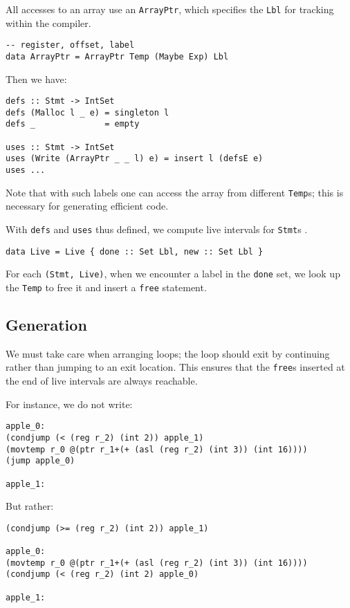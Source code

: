 \documentclass[acmsmall,screen,anonymous,nonacm]{acmart}
\begin{document}
All accesses to an array use an {\tt ArrayPtr}, which specifies the {\tt Lbl} for tracking within the compiler.

\begin{verbatim}
-- register, offset, label
data ArrayPtr = ArrayPtr Temp (Maybe Exp) Lbl
\end{verbatim}

Then we have:

\begin{verbatim}
defs :: Stmt -> IntSet
defs (Malloc l _ e) = singleton l
defs _              = empty

uses :: Stmt -> IntSet
uses (Write (ArrayPtr _ _ l) e) = insert l (defsE e)
uses ...
\end{verbatim}


Note that with such labels one can access the array from different {\tt Temp}s; this is necessary for generating efficient code.

With {\tt defs} and {\tt uses} thus defined, we compute live intervals for {\tt Stmt}s \cite{poletto1999}.

\begin{verbatim}
data Live = Live { done :: Set Lbl, new :: Set Lbl }
\end{verbatim}

For each {\tt (Stmt, Live)}, when we encounter a label in the {\tt done} set, we look up the {\tt Temp} to free it and insert a {\tt free} statement.

\subsection{Generation}

We must take care when arranging loops; the loop should exit by continuing rather than jumping to an exit location. This ensures that the {\tt free}s inserted at the end of live intervals are always reachable.

For instance, we do not write:

\begin{verbatim}
apple_0:
(condjump (< (reg r_2) (int 2)) apple_1)
(movtemp r_0 @(ptr r_1+(+ (asl (reg r_2) (int 3)) (int 16))))
(jump apple_0)

apple_1:
\end{verbatim}

But rather:

\begin{verbatim}
(condjump (>= (reg r_2) (int 2)) apple_1)

apple_0:
(movtemp r_0 @(ptr r_1+(+ (asl (reg r_2) (int 3)) (int 16))))
(condjump (< (reg r_2) (int 2) apple_0)

apple_1:
\end{verbatim}
\end{document}
